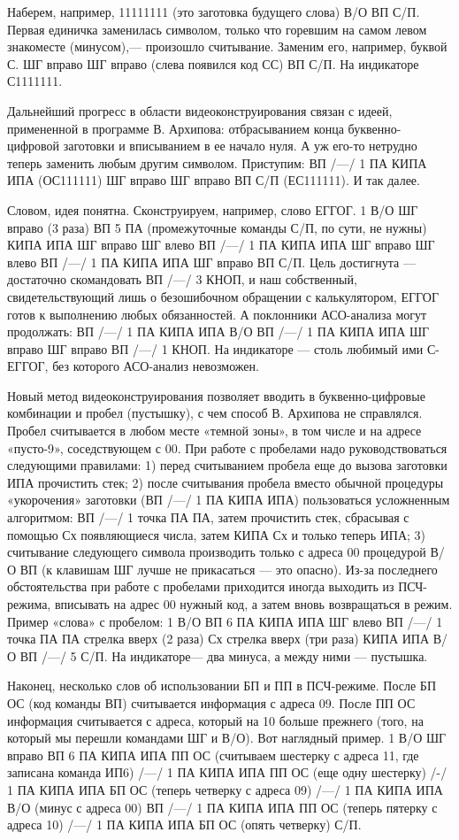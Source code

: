 \documentclass[11pt,a4paper,oneside]{article}
\begin{document}
Наберем, например, 11111111 (это заготовка будущего слова) В/О ВП С/П. Первая единичка заменилась символом, только что горевшим на самом левом знакоместе (минусом),— произошло считывание. Заменим его, например, буквой С. ШГ вправо ШГ вправо (слева появился код СС) ВП С/П. На индикаторе С1111111.

Дальнейший прогресс в области видеоконструирования связан с идеей, примененной в программе В. Архипова: отбрасыванием конца буквенно-цифровой заготовки и вписыванием в ее начало нуля. А уж его-то нетрудно теперь заменить любым другим символом. Приступим: ВП /—/ 1 ПА КИПА ИПА (ОС111111) ШГ вправо ШГ вправо ВП С/П (ЕС111111). И так далее.

Словом, идея понятна. Сконструируем, например, слово ЕГГОГ. 1 В/О ШГ вправо (3 раза) ВП 5 ПА (промежуточные команды С/П, по сути, не нужны) КИПА ИПА ШГ вправо ШГ влево ВП /—/ 1 ПА КИПА ИПА ШГ вправо ШГ влево ВП /—/ 1 ПА КИПА ИПА ШГ вправо ВП С/П. Цель достигнута — достаточно скомандовать ВП /—/ 3 КНОП, и наш собственный, свидетельствующий лишь о безошибочном обращении с калькулятором, ЕГГОГ готов к выполнению любых обязанностей. А поклонники АСО-анализа могут продолжать: ВП /—/ 1 ПА КИПА ИПА В/О ВП /—/ 1 ПА КИПА ИПА ШГ вправо ШГ вправо ВП /—/ 1 КНОП. На индикаторе — столь любимый ими С-ЕГГОГ, без которого АСО-анализ невозможен.

Новый метод видеоконструирования позволяет вводить в буквенно-цифровые комбинации и пробел (пустышку), с чем способ В. Архипова не справлялся. Пробел считывается в любом месте «темной зоны», в том числе и на адресе «пусто-9», соседствующем с 00. При работе с пробелами надо руководствоваться следующими правилами: 1) перед считыванием пробела еще до вызова заготовки ИПА прочистить стек; 2) после считывания пробела вместо обычной процедуры «укорочения» заготовки (ВП /—/ 1 ПА КИПА ИПА) пользоваться усложненным алгоритмом: ВП /—/ 1 точка ПА ПА, затем прочистить стек, сбрасывая с помощью Сх появляющиеся числа, затем КИПА Сх и только теперь ИПА; 3) считывание следующего символа производить только с адреса 00 процедурой В/О ВП (к клавишам ШГ лучше не прикасаться — это опасно). Из-за последнего обстоятельства при работе с пробелами приходится иногда выходить из ПСЧ-режима, вписывать на адрес 00 нужный код, а затем вновь возвращаться в режим.
Пример «слова» с пробелом: 1 В/О ВП 6 ПА КИПА ИПА ШГ влево ВП /—/ 1 точка ПА ПА стрелка вверх (2 раза) Сх стрелка вверх (три раза) КИПА ИПА В/О ВП /—/ 5 С/П. На индикаторе— два минуса, а между ними — пустышка.

Наконец, несколько слов об использовании БП и ПП в ПСЧ-режиме. После БП ОС (код команды ВП) считывается информация с адреса 09. После ПП ОС информация считывается с адреса, который на 10 больше прежнего (того, на который мы перешли командами ШГ и В/О). Вот наглядный пример. 1 В/О ШГ вправо ВП 6 ПА КИПА ИПА ПП ОС (считываем шестерку с адреса 11, где записана команда ИП6) /—/ 1 ПА КИПА ИПА ПП ОС (еще одну шестерку) /-/ 1 ПА КИПА ИПА БП ОС (теперь четверку с адреса 09) /—/ 1 ПА КИПА ИПА В/О (минус с адреса 00) ВП /—/ 1 ПА КИПА ИПА ПП ОС (теперь пятерку с адреса 10) /—/ 1 ПА КИПА ИПА БП ОС (опять четверку) С/П.
\end{document}
